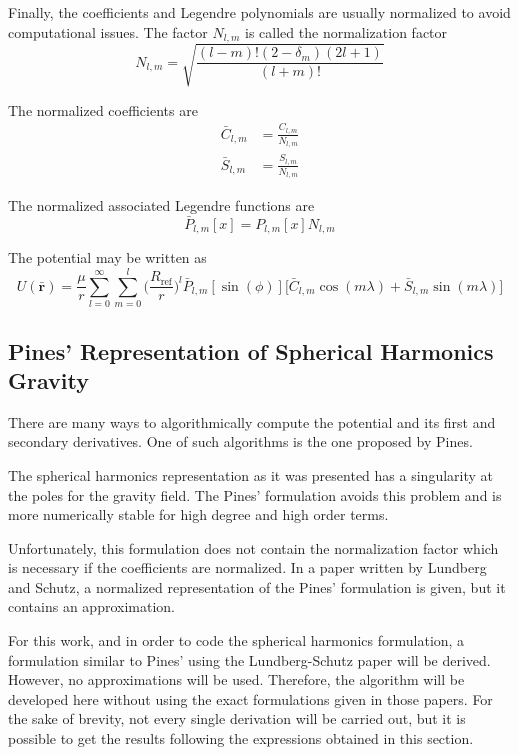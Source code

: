 \documentclass[]{AVSSimReportMemo}
\begin{document}
Finally, the coefficients and Legendre polynomials are usually normalized to avoid computational issues. The factor $N_{l,m}$ is called the normalization factor
\begin{equation}
N_{l,m} = \sqrt{\frac{(l-m)! (2 -\delta_m) (2 l +1)}{(l+m)!}}
\end{equation}

The normalized coefficients are
\begin{align}
\bar C_{l,m} &= \frac{C_{l,m}}{N_{l,m}}\\
\bar S_{l,m} &= \frac{S_{l,m}}{N_{l,m}}
\end{align}

The normalized associated Legendre functions are
\begin{equation}
\bar P_{l,m}[x] = P_{l,m}[x] N_{l,m}
\end{equation}

The potential may be written as
\begin{equation}
U(\mathbf{\bar r}) = \frac{\mu}{r} \sum_{l=0}^\infty \sum_{m=0}^l \bigg(\frac{R_{\text{ref}}}{r}\bigg)^l \bar P_{l,m}[\sin(\phi)] \big[\bar C_{l,m} \cos(m \lambda) + \bar S_{l,m} \sin(m \lambda)\big]
\end{equation}

\subsection{Pines' Representation of Spherical Harmonics Gravity}

There are many ways to algorithmically compute the potential and its first and secondary derivatives. One of such algorithms is the one proposed by Pines\cite{pines1973}.

The spherical harmonics representation as it was presented has a singularity at the poles for the gravity field. The Pines' formulation avoids this problem and is more numerically stable for high degree and high order terms.

Unfortunately, this formulation does not contain the normalization factor which is necessary if the coefficients are normalized. In a paper written by Lundberg and Schutz\cite{lundberg1988}, a normalized representation of the Pines' formulation is given, but it contains an approximation.

For this work, and in order to code the spherical harmonics formulation, a formulation similar to Pines' using the Lundberg-Schutz paper will be derived. However, no approximations will be used. Therefore, the algorithm will be developed here without using the exact formulations given in those papers. For the sake of brevity, not every single derivation will be carried out, but it is possible to get the results following the expressions obtained in this section.
\end{document}
